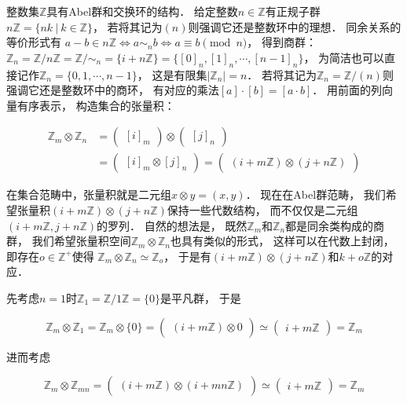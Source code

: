 \documentclass[10pt, openany]{book}
\begin{document}
整数集$\mathbb Z$具有Abel群和交换环的结构．
给定整数$n \in \mathbb Z$有正规子群$n\mathbb Z = \{nk \ | \ k\in \mathbb Z\}$，
若将其记为$(n)$则强调它还是整数环中的理想．
同余关系的等价形式有 $a - b \in n\mathbb Z \Leftrightarrow a \sim_n b \Leftrightarrow a \equiv b \pmod n$，
得到商群：
$\mathbb Z_n = \mathbb Z/n\mathbb Z = \mathbb Z/\sim_n = \{ i + n\mathbb Z\} = \{[0]_n,[1]_n,\cdots,[n-1]_n\}$，
为简洁也可以直接记作$\mathbb Z_n = \{0,1,\cdots,n-1\}$，
这是有限集$|\mathbb Z_n| = n$．
若将其记为$\mathbb Z_n = \mathbb Z/(n)$则强调它还是整数环中的商环，
有对应的乘法$[a] \cdot [b] = [a \cdot b]$．
用前面的列向量有序表示，
构造集合的张量积：

$$
\begin{aligned}
\mathbb Z_m \otimes \mathbb Z_n 
&=\begin{pmatrix}[i]_m\end{pmatrix}
\otimes \begin{pmatrix}[j]_n\end{pmatrix} \\
&=\begin{pmatrix}[i]_m \otimes [j]_n\end{pmatrix}
=\begin{pmatrix}(i + m\mathbb Z) \otimes (j + n\mathbb Z)\end{pmatrix}
\end{aligned}
$$

在集合范畴中，张量积就是二元组$x \otimes y = (x,y)$．
现在在Abel群范畴，
我们希望张量积$(i + m\mathbb Z) \otimes (j + n\mathbb Z)$保持一些代数结构，
而不仅仅是二元组$(i + m\mathbb Z,j + n\mathbb Z)$的罗列．
自然的想法是，
既然$\mathbb Z_m$和$\mathbb Z_n$都是同余类构成的商群，
我们希望张量积空间$\mathbb Z_m \otimes \mathbb Z_n$也具有类似的形式，
这样可以在代数上封闭，
即存在$o\in\mathbb Z^+$使得
$\mathbb Z_m \otimes \mathbb Z_n \simeq \mathbb Z_o$，
于是有$(i + m\mathbb Z) \otimes (j + n\mathbb Z)$和$k + o\mathbb Z$的对应．

先考虑$n=1$时$\mathbb Z_1 = \mathbb Z/1\mathbb Z = \{0\}$是平凡群，
于是

$$
\mathbb Z_m \otimes \mathbb Z_1 = \mathbb Z_m \otimes \{0\}
= \begin{pmatrix}(i + m\mathbb Z) \otimes 0 \end{pmatrix}
\simeq \begin{pmatrix}i + m\mathbb Z\end{pmatrix}
= \mathbb Z_m
$$

进而考虑

$$
\mathbb Z_m \otimes \mathbb Z_{mn}
= \begin{pmatrix}(i + m\mathbb Z) \otimes (i + mn\mathbb Z) \end{pmatrix}
\simeq \begin{pmatrix}i + m\mathbb Z\end{pmatrix}
= \mathbb Z_m
$$
\end{document}
